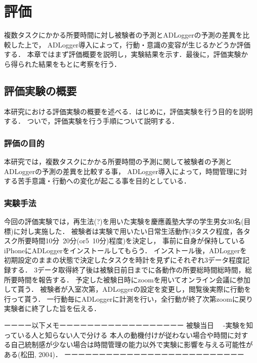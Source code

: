 \chapter{評価}
複数タスクにかかる所要時間に対し被験者の予測とADLoggerの予測の差異を比較した上で，
ADLogger導入によって，行動・意識の変容が生じるかどうか評価する．
本章ではまず評価概要を説明し，実験結果を示す．最後に，評価実験から得られた結果をもとに考察を行う．

\section{評価実験の概要}
本研究における評価実験の概要を述べる．はじめに，評価実験を行う目的を説明する．
ついで，評価実験を行う手順について説明する．

\subsection{評価の目的}
本研究では，複数タスクにかかる所要時間の予測に関して被験者の予測とADLoggerの予測の差異を比較する事，
ADLogger導入によって，時間管理に対する苦手意識・行動への変化が起こる事を目的としている．

\subsection{実験手法}%
今回の評価実験では，再生法\cite{Oguro1961}\cite{Tayama2018}(?)を用いた実験を慶應義塾大学の学生男女30名(目標)に対し実施した．
被験者は実験で用いたい日常生活動作(3タスク程度，各タスク所要時間10分~20分(or5~10分)程度)を決定し，
事前に自身が保持しているiPhoneにADLoggerをインストールしてもらう．
インストール後，ADLoggerを初期設定のままの状態で決定したタスクを時計を見ずにそれぞれ3データ程度記録する．
3データ取得終了後は被験日前日までに各動作の所要総時間総時間，総所要時間を報告する．
予定した被験日時にzoom\cite{zoom}を用いてオンライン会議に参加して貰う．
被験者が入室次第，ADLoggerの設定を変更し，閲覧後実際に行動を行って貰う．
一行動毎にADLoggerに計測を行い，全行動が終了次第zoomに戻り実験者に終了した旨を伝える．

ーーーー以下メモーーーーーーーーーーーーーーーーーー
被験当日
　-実験を知っている人と知らない人で分ける
本人の動機付けが従わない場合や時間に対する自己統制感が少ない場合は時間管理の能力以外で実験に影響を与える可能性がある(松田, 2004)．
ーーーーーーーーーーーーーーーーーーーーーーーーーー


